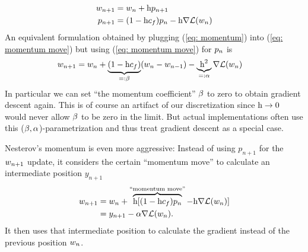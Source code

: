 \begin{definition}
	\begin{subequations}
	\begin{align}
		w_{n+1} &= w_n + \text{h} p_{n+1} \label{eq: momentum move}\\
		p_{n+1} &= (1-\text{h}c_f)p_n - \text{h}\nabla \mathcal{L}(w_n)
		\label{eq: momentum}
	\end{align}
	\end{subequations}
	An equivalent formulation obtained by plugging (\ref{eq: momentum}) into
	(\ref{eq: momentum move}) but using (\ref{eq: momentum move}) for
	\(p_n\) is
	\begin{align}\label{eq: flat momentum}
		w_{n+1}
		&= w_n
		+ \underbrace{(1-\text{h}c_f)}_{
			=:\beta
		}(w_n - w_{n-1})
		- \underbrace{\text{h}^2}_{=:\alpha}\nabla \mathcal{L}(w_n)
	\end{align}
	In particular we can set ``the momentum coefficient'' \(\beta\) to zero to
	obtain gradient descent again. This is of course an artifact of our
	discretization since \(\text{h}\to0\) would never allow \(\beta\) to be zero
	in the limit. But actual implementations often use this
	(\(\beta,\alpha\))-parametrization and thus treat gradient descent as a
	special case.
\end{definition}
%
Nesterov's momentum is even more aggressive: Instead of using \(p_{n+1}\) for
the \(w_{n+1}\) update, it considers the certain ``momentum move''
to calculate an intermediate position \(y_{n+1}\)
%
\begin{align*}
	w_{n+1}
	&= w_n + \overbrace{\text{h} [(1-\text{h}c_f)p_n}^{\text{``momentum move''}}
	- \text{h}\nabla \mathcal{L}(w_n)] \\
	&= y_{n+1} - \alpha \nabla \mathcal{L}(w_n).
\end{align*}
%
It then uses that intermediate position to calculate the gradient instead of the
previous position \(w_n\).
%
